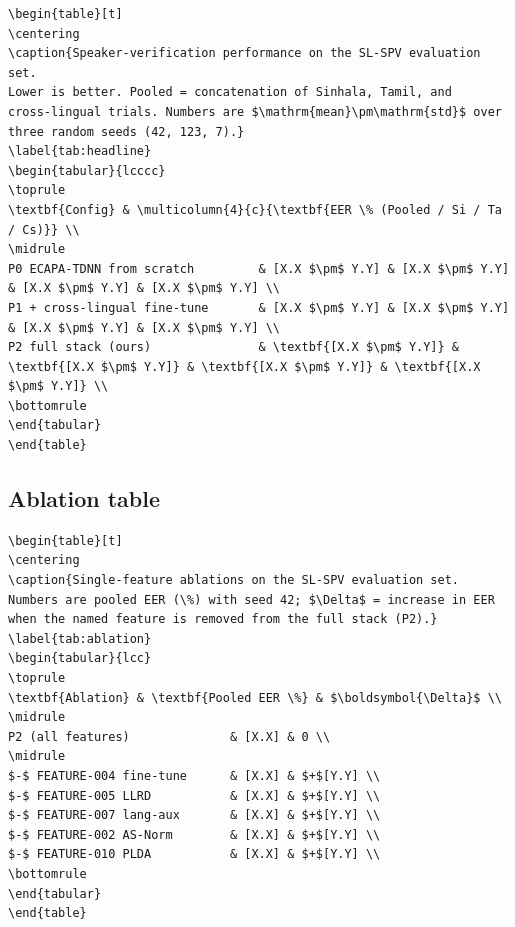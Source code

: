 \documentclass[10pt,a4paper]{article}
\begin{document}
\begin{Verbatim}[fontsize=\small,frame=single,framesep=4pt]
\begin{table}[t]
\centering
\caption{Speaker-verification performance on the SL-SPV evaluation set.
Lower is better. Pooled = concatenation of Sinhala, Tamil, and
cross-lingual trials. Numbers are $\mathrm{mean}\pm\mathrm{std}$ over
three random seeds (42, 123, 7).}
\label{tab:headline}
\begin{tabular}{lcccc}
\toprule
\textbf{Config} & \multicolumn{4}{c}{\textbf{EER \% (Pooled / Si / Ta / Cs)}} \\
\midrule
P0 ECAPA-TDNN from scratch         & [X.X $\pm$ Y.Y] & [X.X $\pm$ Y.Y] & [X.X $\pm$ Y.Y] & [X.X $\pm$ Y.Y] \\
P1 + cross-lingual fine-tune       & [X.X $\pm$ Y.Y] & [X.X $\pm$ Y.Y] & [X.X $\pm$ Y.Y] & [X.X $\pm$ Y.Y] \\
P2 full stack (ours)               & \textbf{[X.X $\pm$ Y.Y]} & \textbf{[X.X $\pm$ Y.Y]} & \textbf{[X.X $\pm$ Y.Y]} & \textbf{[X.X $\pm$ Y.Y]} \\
\bottomrule
\end{tabular}
\end{table}
\end{Verbatim}


\subsection*{Ablation table}


\begin{Verbatim}[fontsize=\small,frame=single,framesep=4pt]
\begin{table}[t]
\centering
\caption{Single-feature ablations on the SL-SPV evaluation set.
Numbers are pooled EER (\%) with seed 42; $\Delta$ = increase in EER
when the named feature is removed from the full stack (P2).}
\label{tab:ablation}
\begin{tabular}{lcc}
\toprule
\textbf{Ablation} & \textbf{Pooled EER \%} & $\boldsymbol{\Delta}$ \\
\midrule
P2 (all features)              & [X.X] & 0 \\
\midrule
$-$ FEATURE-004 fine-tune      & [X.X] & $+$[Y.Y] \\
$-$ FEATURE-005 LLRD           & [X.X] & $+$[Y.Y] \\
$-$ FEATURE-007 lang-aux       & [X.X] & $+$[Y.Y] \\
$-$ FEATURE-002 AS-Norm        & [X.X] & $+$[Y.Y] \\
$-$ FEATURE-010 PLDA           & [X.X] & $+$[Y.Y] \\
\bottomrule
\end{tabular}
\end{table}
\end{Verbatim}
\end{document}
